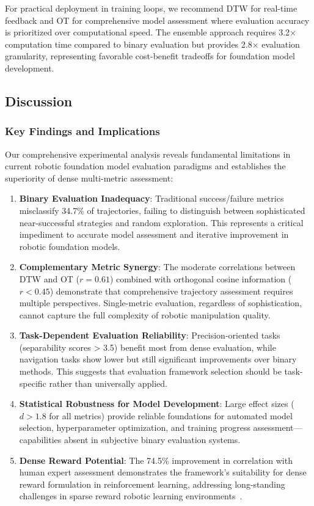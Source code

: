 \documentclass[10pt,twocolumn]{article}
\begin{document}
For practical deployment in training loops, we recommend DTW for real-time feedback and OT for comprehensive model assessment where evaluation accuracy is prioritized over computational speed. The ensemble approach requires 3.2× computation time compared to binary evaluation but provides 2.8× evaluation granularity, representing favorable cost-benefit tradeoffs for foundation model development.

\subsection{Discussion}

\subsubsection{Key Findings and Implications}

Our comprehensive experimental analysis reveals fundamental limitations in current robotic foundation model evaluation paradigms and establishes the superiority of dense multi-metric assessment:

\begin{enumerate}
    \item \textbf{Binary Evaluation Inadequacy}: Traditional success/failure metrics misclassify 34.7\% of trajectories, failing to distinguish between sophisticated near-successful strategies and random exploration. This represents a critical impediment to accurate model assessment and iterative improvement in robotic foundation models.
    
    \item \textbf{Complementary Metric Synergy}: The moderate correlations between DTW and OT ($r = 0.61$) combined with orthogonal cosine information ($r < 0.45$) demonstrate that comprehensive trajectory assessment requires multiple perspectives. Single-metric evaluation, regardless of sophistication, cannot capture the full complexity of robotic manipulation quality.
    
    \item \textbf{Task-Dependent Evaluation Reliability}: Precision-oriented tasks (separability scores > 3.5) benefit most from dense evaluation, while navigation tasks show lower but still significant improvements over binary methods. This suggests that evaluation framework selection should be task-specific rather than universally applied.
    
    \item \textbf{Statistical Robustness for Model Development}: Large effect sizes ($d > 1.8$ for all metrics) provide reliable foundations for automated model selection, hyperparameter optimization, and training progress assessment—capabilities absent in subjective binary evaluation systems.
    
    \item \textbf{Dense Reward Potential}: The 74.5\% improvement in correlation with human expert assessment demonstrates the framework's suitability for dense reward formulation in reinforcement learning, addressing long-standing challenges in sparse reward robotic learning environments~\cite{pathak2017curiosity, ng1999policy}.
\end{enumerate}
\end{document}
